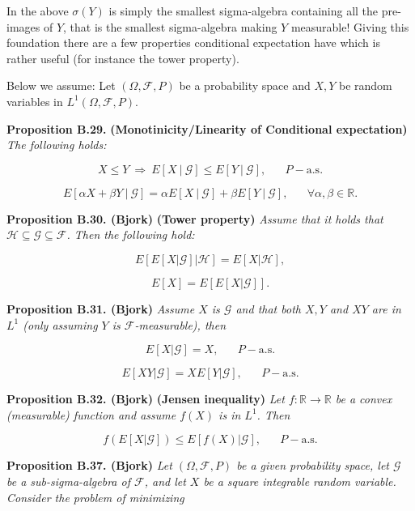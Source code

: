 \documentclass[a4paper,12pt,openany]{book}
\begin{document}
In the above \(\sigma(Y)\) is simply the smallest sigma-algebra containing all the pre-images of \(Y\), that is the smallest sigma-algebra making \(Y\) measurable! Giving this foundation there are a few properties conditional expectation have which is rather useful (for instance the tower property).

Below we assume: Let \((\Omega,\mathcal{F},P)\) be a probability space and \(X,Y\) be random variables in \(L^1(\Omega,\mathcal{F},P)\).

\textbf{Proposition B.29.} \textbf{(Monotinicity/Linearity of Conditional expectation)} \emph{The following holds:}

\[
X\le Y\ \Rightarrow\ E[X\ \vert\ \mathcal{G}]\le E[Y\ \vert\ \mathcal{G}],\hspace{20pt}P-\text{a.s.}\tag{B.6}
\]

\[
E[\alpha X + \beta Y\ \vert\ \mathcal{G}]=\alpha E[X\ \vert\ \mathcal{G}]+ \beta E[Y\ \vert\ \mathcal{G}],\hspace{20pt}\forall \alpha,\beta\in\mathbb{R}.\tag{B.7}
\]

\textbf{Proposition B.30. (Bjork)} \textbf{(Tower property)} \emph{Assume that it holds that \(\mathcal{H}\subseteq\mathcal{G}\subseteq\mathcal{F}\). Then the following hold:}

\[
E[E[X\vert \mathcal{G}]\vert\mathcal{H}]=E[X\vert \mathcal{H}],\tag{B.8}
\]

\[
E[X]=E[E[X\vert \mathcal{G}]].\tag{B.9}
\]

\textbf{Proposition B.31. (Bjork)} \emph{Assume \(X\) is \(\mathcal{G}\) and that both \(X,Y\) and \(XY\) are in \(L^1\) (only assuming \(Y\) is \(\mathcal{F}\)-measurable), then}

\[
E[X\vert\mathcal{G}]=X,\hspace{20pt}P-\text{a.s.}\tag{B.11}
\]

\[
E[XY\vert\mathcal{G}]=XE[Y\vert\mathcal{G}],\hspace{20pt}P-\text{a.s.}\tag{B.12}
\]

\textbf{Proposition B.32. (Bjork)} \textbf{(Jensen inequality)} \emph{Let \(f:\mathbb{R}\to\mathbb{R}\) be a convex (measurable) function and assume \(f(X)\) is in \(L^1\). Then}

\[
f(E[X\vert\mathcal{G}])\le E[f(X)\vert\mathcal{G}],\hspace{20pt}P-\text{a.s.}
\]

\textbf{Proposition B.37. (Bjork)} \emph{Let \((\Omega,\mathcal{F},P)\) be a given probability space, let \(\mathcal{G}\) be a sub-sigma-algebra of \(\mathcal{F}\), and let \(X\) be a square integrable random variable.
Consider the problem of minimizing}
\end{document}
